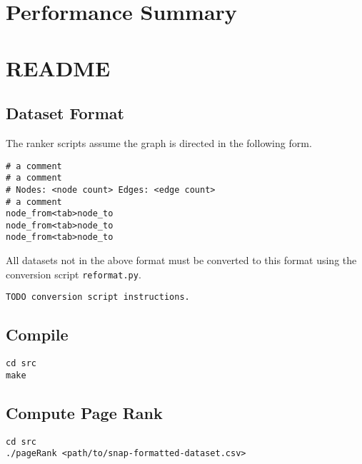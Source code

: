 \documentclass[draft]{report}
\begin{document}
\section{Performance Summary}

\appendix

\section{README}

\subsection{Dataset Format}
The ranker scripts assume the graph is directed in the following form.

\begin{lstlisting}
# a comment
# a comment
# Nodes: <node count> Edges: <edge count>
# a comment
node_from<tab>node_to
node_from<tab>node_to
node_from<tab>node_to
\end{lstlisting}

All datasets not in the above format must be converted to this format using the conversion script \texttt{reformat.py}.

\begin{lstlisting}
TODO conversion script instructions.
\end{lstlisting}

\subsection{Compile}
\begin{lstlisting}
cd src
make
\end{lstlisting}

\subsection{Compute Page Rank}
\begin{lstlisting}
cd src
./pageRank <path/to/snap-formatted-dataset.csv>
\end{lstlisting}
\end{document}
